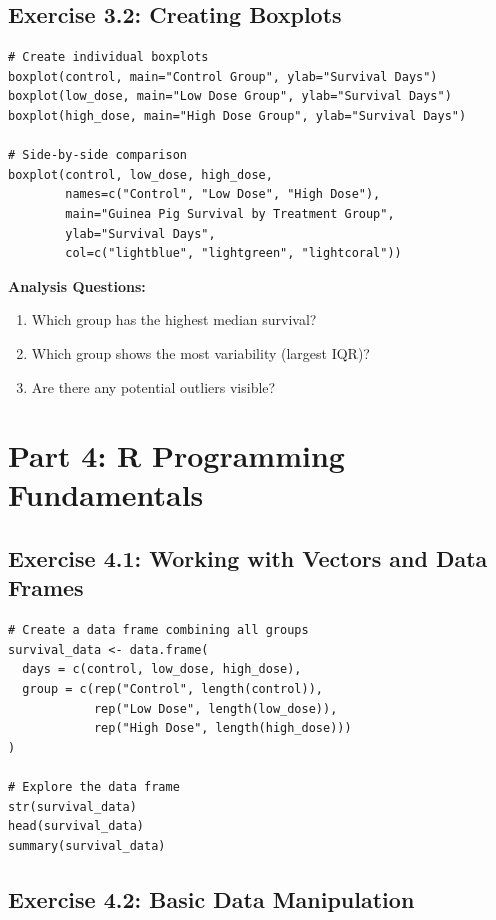 \documentclass[11pt]{article}
\begin{document}
\subsection{Exercise 3.2: Creating Boxplots}

\begin{lstlisting}
# Create individual boxplots
boxplot(control, main="Control Group", ylab="Survival Days")
boxplot(low_dose, main="Low Dose Group", ylab="Survival Days")
boxplot(high_dose, main="High Dose Group", ylab="Survival Days")

# Side-by-side comparison
boxplot(control, low_dose, high_dose,
        names=c("Control", "Low Dose", "High Dose"),
        main="Guinea Pig Survival by Treatment Group",
        ylab="Survival Days",
        col=c("lightblue", "lightgreen", "lightcoral"))
\end{lstlisting}

\textbf{Analysis Questions:}
\begin{enumerate}
\item Which group has the highest median survival?
\item Which group shows the most variability (largest IQR)?
\item Are there any potential outliers visible?
\end{enumerate}

\section{Part 4: R Programming Fundamentals}

\subsection{Exercise 4.1: Working with Vectors and Data Frames}

\begin{lstlisting}
# Create a data frame combining all groups
survival_data <- data.frame(
  days = c(control, low_dose, high_dose),
  group = c(rep("Control", length(control)),
            rep("Low Dose", length(low_dose)),
            rep("High Dose", length(high_dose)))
)

# Explore the data frame
str(survival_data)
head(survival_data)
summary(survival_data)
\end{lstlisting}

\subsection{Exercise 4.2: Basic Data Manipulation}
\end{document}
